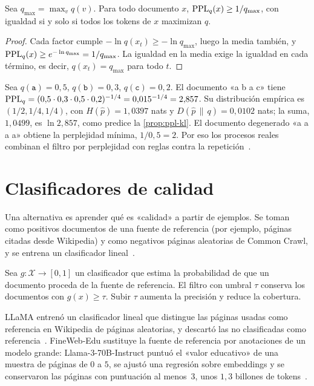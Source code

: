 \begin{corolario}\label{cor:repeticion}
Sea $q_{\max}=\max_v q(v)$. Para todo documento $x$, $\operatorname{PPL}_q(x)\ge 1/q_{\max}$, con igualdad si y solo si todos los tokens de $x$ maximizan $q$.
\end{corolario}

\begin{proof}
Cada factor cumple $-\ln q(x_t)\ge-\ln q_{\max}$, luego la media también, y $\operatorname{PPL}_q(x)\ge e^{-\ln q_{\max}}=1/q_{\max}$. La igualdad en la media exige la igualdad en cada término, es decir, $q(x_t)=q_{\max}$ para todo $t$.
\end{proof}

\begin{ejemplo}\label{ej:ppl-filtro}
Sea $q(\texttt{a})=0{,}5$, $q(\texttt{b})=0{,}3$, $q(\texttt{c})=0{,}2$. El documento «a b a c» tiene $\operatorname{PPL}_q=(0{,}5\cdot 0{,}3\cdot 0{,}5\cdot 0{,}2)^{-1/4}=0{,}015^{-1/4}=2{,}857$. Su distribución empírica es $(1/2,1/4,1/4)$, con $H(\hat p)=1{,}0397$ nats y $D(\hat p\,\|\,q)=0{,}0102$ nats; la suma, $1{,}0499$, es $\ln 2{,}857$, como predice la \cref{prop:ppl-kl}. El documento degenerado «a a a a» obtiene la perplejidad mínima, $1/0{,}5=2$. Por eso los procesos reales combinan el filtro por perplejidad con reglas contra la repetición~\cite[apéndice~A]{rae}.
\end{ejemplo}

\section{Clasificadores de calidad}

Una alternativa es aprender qué es «calidad» a partir de ejemplos. Se toman como positivos documentos de una fuente de referencia (por ejemplo, páginas citadas desde Wikipedia) y como negativos páginas aleatorias de Common Crawl, y se entrena un clasificador lineal~\cite[§2.7]{cs336a4}.

\begin{definicion}
Sea $g\colon\mathcal{X}\to[0,1]$ un clasificador que estima la probabilidad de que un documento proceda de la fuente de referencia. El filtro con umbral $\tau$ conserva los documentos con $g(x)\ge\tau$. Subir $\tau$ aumenta la precisión y reduce la cobertura.
\end{definicion}

LLaMA entrenó un clasificador lineal que distingue las páginas usadas como referencia en Wikipedia de páginas aleatorias, y descartó las no clasificadas como referencia~\cite[§2.1]{llama}. FineWeb-Edu sustituye la fuente de referencia por anotaciones de un modelo grande: Llama-3-70B-Instruct puntuó el «valor educativo» de una muestra de páginas de $0$ a $5$, se ajustó una regresión sobre embeddings y se conservaron las páginas con puntuación al menos~$3$, unos $1{,}3$ billones de tokens~\cite[§4]{fineweb}.

